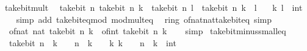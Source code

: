 \begin{isabellebody}
%
\endisatagproof
{\isafoldproof}%
%
\isadelimproof
\isanewline
%
\endisadelimproof
\isanewline
{}\isamarkupfalse%
\ take{\isacharunderscore}{\kern0pt}bit{\isacharunderscore}{\kern0pt}mult{\isacharcolon}{\kern0pt}\isanewline
\ \ {\isacartoucheopen}take{\isacharunderscore}{\kern0pt}bit\ n\ {\isacharparenleft}{\kern0pt}take{\isacharunderscore}{\kern0pt}bit\ n\ k\ {\isacharasterisk}{\kern0pt}\ take{\isacharunderscore}{\kern0pt}bit\ n\ l{\isacharparenright}{\kern0pt}\ {\isacharequal}{\kern0pt}\ take{\isacharunderscore}{\kern0pt}bit\ n\ {\isacharparenleft}{\kern0pt}k\ {\isacharasterisk}{\kern0pt}\ l{\isacharparenright}{\kern0pt}{\isacartoucheclose}\isanewline
\ \ \ k\ l\ {\isacharcolon}{\kern0pt}{\isacharcolon}{\kern0pt}\ int\isanewline
%
\isadelimproof
\ \ %
\endisadelimproof
%
\isatagproof
{}\isamarkupfalse%
\ {\isacharparenleft}{\kern0pt}simp\ add{\isacharcolon}{\kern0pt}\ take{\isacharunderscore}{\kern0pt}bit{\isacharunderscore}{\kern0pt}eq{\isacharunderscore}{\kern0pt}mod\ mod{\isacharunderscore}{\kern0pt}mult{\isacharunderscore}{\kern0pt}eq{\isacharparenright}{\kern0pt}%
\endisatagproof
{\isafoldproof}%
%
\isadelimproof
\isanewline
%
\endisadelimproof
\isanewline
{}\isamarkupfalse%
\ {\isacharparenleft}{\kern0pt}\ ring{\isacharunderscore}{\kern0pt}{}{\isacharparenright}{\kern0pt}\ of{\isacharunderscore}{\kern0pt}nat{\isacharunderscore}{\kern0pt}nat{\isacharunderscore}{\kern0pt}take{\isacharunderscore}{\kern0pt}bit{\isacharunderscore}{\kern0pt}eq\ {\isacharbrackleft}{\kern0pt}simp{\isacharbrackright}{\kern0pt}{\isacharcolon}{\kern0pt}\isanewline
\ \ {\isacartoucheopen}of{\isacharunderscore}{\kern0pt}nat\ {\isacharparenleft}{\kern0pt}nat\ {\isacharparenleft}{\kern0pt}take{\isacharunderscore}{\kern0pt}bit\ n\ k{\isacharparenright}{\kern0pt}{\isacharparenright}{\kern0pt}\ {\isacharequal}{\kern0pt}\ of{\isacharunderscore}{\kern0pt}int\ {\isacharparenleft}{\kern0pt}take{\isacharunderscore}{\kern0pt}bit\ n\ k{\isacharparenright}{\kern0pt}{\isacartoucheclose}\isanewline
%
\isadelimproof
\ \ %
\endisadelimproof
%
\isatagproof
{}\isamarkupfalse%
\ simp%
\endisatagproof
{\isafoldproof}%
%
\isadelimproof
\isanewline
%
\endisadelimproof
\isanewline
{}\isamarkupfalse%
\ take{\isacharunderscore}{\kern0pt}bit{\isacharunderscore}{\kern0pt}minus{\isacharunderscore}{\kern0pt}small{\isacharunderscore}{\kern0pt}eq{\isacharcolon}{\kern0pt}\isanewline
\ \ {\isacartoucheopen}take{\isacharunderscore}{\kern0pt}bit\ n\ {\isacharparenleft}{\kern0pt}{\isacharminus}{\kern0pt}\ k{\isacharparenright}{\kern0pt}\ {\isacharequal}{\kern0pt}\ {}\ {\isacharcircum}{\kern0pt}\ n\ {\isacharminus}{\kern0pt}\ k{\isacartoucheclose}\ \ {\isacartoucheopen}{}\ {\isacharless}{\kern0pt}\ k{\isacartoucheclose}\ {\isacartoucheopen}k\ {\isasymle}\ {}\ {\isacharcircum}{\kern0pt}\ n{\isacartoucheclose}\ \ k\ {\isacharcolon}{\kern0pt}{\isacharcolon}{\kern0pt}\ int\isanewline

\end{isabellebody}
